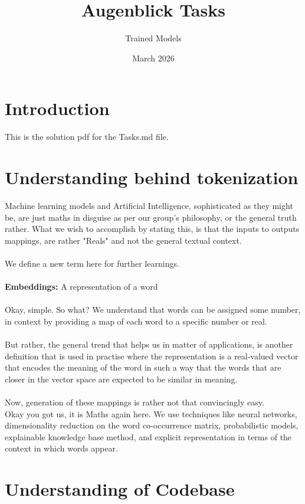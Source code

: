 \documentclass{article}
\title{Augenblick Tasks}
\author{Trained Models}
\date{March 2026}
\begin{document}
\maketitle

\section{Introduction}

This is the solution pdf for the Tasks.md file.

\section{Understanding behind tokenization}

Machine learning models and Artificial Intelligence, sophisticated as they might be, are just maths in disguise as per our group's philosophy, or the general truth rather. What we wish to accomplish by stating this, is that the inputs to outputs mappings, are rather "Reals" and not the general textual context.
\\
\\
We define a new term here for further learnings. \\ \\
\textbf{Embeddings: } A representation of a word \\ \\
Okay,  simple. So what? We understand that words can be assigned some number, in context by providing a map of each word to a specific number or real. \\  \\
But rather, the general trend that helps us in matter of applications, is another definition that is used in practise where the representation is a real-valued vector that encodes the meaning of the word in such a way that the words that are closer in the vector space are expected to be similar in meaning. \\ \\
Now, generation of these mappings is rather not that convincingly easy. \\
Okay you got us, it is Maths again here. We use techniques like neural networks, dimensionality reduction on the word co-occurrence matrix, probabilistic models, explainable knowledge base method, and explicit representation in terms of the context in which words appear. \cite{wiki_embedding}

\section{Understanding of Codebase}
\end{document}
